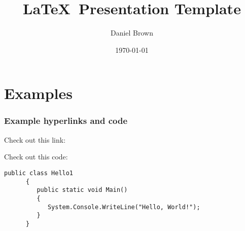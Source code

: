 \documentclass[aspectratio=1610]{beamer}
\title[Presentation Template]{\LaTeX\ Presentation Template}
\author[DTB]{Daniel Brown}
\institute[UoY, CS]{The University of York, Department of Computer Science}
\date{\today}
\begin{document}
\frame{\titlepage}

\section{Examples} %
  \begin{frame}[containsverbatim]
    \frametitle{Example hyperlinks and code}
    Check out this link: \vspace{10 mm}

    Check out this code:
    \begin{lstlisting}[caption=Some C$^\sharp$ code in the presentation!, label=lst:test]
      public class Hello1
      {
         public static void Main()
         {
            System.Console.WriteLine("Hello, World!");
         }
      }
    \end{lstlisting}
  \end{frame}
\end{document}
